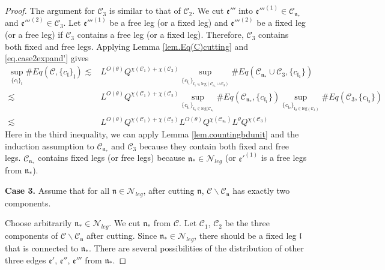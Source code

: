 \begin{proof}
    The argument for $\mathcal{C}_3$ is similar to that of $\mathcal{C}_2$. We cut $\mathfrak{e}'''$ into $\mathfrak{e}'''^{(1)}\in \mathcal{C}_{\mathfrak{n}_*}$ and $\mathfrak{e}'''^{(2)}\in \mathcal{C}_3$. Let $\mathfrak{e}'''^{(1)}$ be a free leg (or a fixed leg) and $\mathfrak{e}'''^{(2)}$ be a fixed leg (or a free leg) if $\mathcal{C}_3$ contains a free leg (or a fixed leg). Therefore, $\mathcal{C}_3$ contains both fixed and free legs. Applying Lemma \ref{lem.Eq(C)cutting} and \eqref{eq.case2expand'} gives
    \begin{equation}
    \begin{split}
     \sup_{\{c_{\mathfrak{l}}\}_{\mathfrak{l}}}\#Eq(\mathcal{C},\{c_{\mathfrak{l}}\}_{\mathfrak{l}})
     \lesssim& L^{O(\theta)} Q^{\chi(\mathcal{C}_1)+\chi(\mathcal{C}_2)}\sup_{\{c_{\mathfrak{l}_1}\}_{\mathfrak{l}_1\in \text{leg}(\mathcal{C}_{\mathfrak{n}_*}\cup \mathcal{C}_3)} } \# Eq(\mathcal{C}_{\mathfrak{n}_*}\cup \mathcal{C}_3,\{c_{\mathfrak{l}_1}\}) 
     \\
     \lesssim& L^{O(\theta)} Q^{\chi(\mathcal{C}_1)+\chi(\mathcal{C}_2)}\sup_{\{c_{\mathfrak{l}_1}\}_{\mathfrak{l}_1\in \text{leg}(\mathcal{C}_{\mathfrak{n}_*}} } \# Eq(\mathcal{C}_{\mathfrak{n}_*},\{c_{\mathfrak{l}_1}\}) \sup_{\{c_{\mathfrak{l}_2}\}_{\mathfrak{l}_2\in \text{leg}(\mathcal{C}_3)} }\# Eq(\mathcal{C}_{3}, \{c_{\mathfrak{l}_2}\})
     \\
     \lesssim& L^{O(\theta)} Q^{\chi(\mathcal{C}_1)+\chi(\mathcal{C}_2)} L^{O(\theta)} Q^{\chi(\mathcal{C}_{\mathfrak{n}_*})} L^\theta Q^{\chi(\mathcal{C}_3)} 
    \end{split}
    \end{equation}
    Here in the third inequality, we can apply Lemma \ref{lem.countingbdunit} and the induction assumption to $\mathcal{C}_{\mathfrak{n}_*}$ and $\mathcal{C}_3$ because they contain both fixed and free legs. $\mathcal{C}_{\mathfrak{n}_*}$ contains fixed legs (or free legs) because $\mathfrak{n}_*\in\mathcal{N}_{leg}$ (or $\mathfrak{e}'^{(1)}$ is a free legs from $\mathfrak{n}_*$).
    
    \textbf{Case 3.} Assume that for all $\mathfrak{n}\in \mathcal{N}_{leg}$, after cutting $\mathfrak{n}$, $\mathcal{C}\backslash \mathcal{C}_{\mathfrak{n}}$ has exactly two components.
    
    Choose arbitrarily $\mathfrak{n}_*\in \mathcal{N}_{leg}$. We cut $\mathfrak{n}_*$ from $\mathcal{C}$. Let $\mathcal{C}_1$, $\mathcal{C}_2$ be the three components of $\mathcal{C}\backslash \mathcal{C}_{\mathfrak{n}}$ after cutting. Since $\mathfrak{n}_*\in \mathcal{N}_{leg}$, there should be a fixed leg $\mathfrak{l}$ that is connected to $\mathfrak{n}_*$. There are several possibilities of the distribution of other three edges $\mathfrak{e}'$, $\mathfrak{e}''$, $\mathfrak{e}'''$ from $\mathfrak{n}_*$. 
    

\end{proof}

